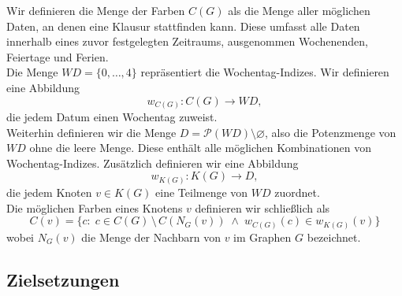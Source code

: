 Wir definieren die Menge der Farben $C(G)$ als die Menge aller möglichen Daten, an denen eine Klausur stattfinden kann. Diese umfasst alle Daten innerhalb eines zuvor festgelegten Zeitraums, ausgenommen Wochenenden, Feiertage und Ferien.\\
Die Menge $WD = \{0, \dots, 4\}$ repräsentiert die Wochentag-Indizes. Wir definieren eine Abbildung 
$$ w_{C(G)} \colon C(G) \rightarrow WD, $$
die jedem Datum einen Wochentag zuweist.\\
Weiterhin definieren wir die Menge $ D = \mathcal{P}(WD) \setminus \varnothing$, also die Potenzmenge von $WD$ ohne die leere Menge. Diese enthält alle möglichen Kombinationen von Wochentag-Indizes. Zusätzlich definieren wir eine Abbildung 
$$ w_{K(G)} \colon K(G) \rightarrow D, $$
die jedem Knoten $v \in K(G)$ eine Teilmenge von $WD$ zuordnet.\\
Die möglichen Farben eines Knotens $v$ definieren wir schließlich als
$$
C(v)= \{ c \colon \; c \in C(G) \, \setminus \, C(N_G(v)) \; \wedge \; w_{C(G)}(c) \in w_{K(G)}(v)\}
$$
wobei $N_G(v)$ die Menge der Nachbarn von $v$ im Graphen $G$ bezeichnet. 

\subsection{Zielsetzungen}